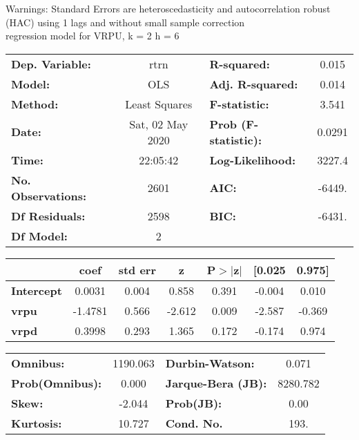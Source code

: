 Warnings: \newline
 [1] Standard Errors are heteroscedasticity and autocorrelation robust (HAC) using 1 lags and without small sample correction\\ 

regression model for VRPU, k = 2 h = 6\begin{center}
\begin{tabular}{lclc}
\toprule
\textbf{Dep. Variable:}    &       rtrn       & \textbf{  R-squared:         } &     0.015   \\
\textbf{Model:}            &       OLS        & \textbf{  Adj. R-squared:    } &     0.014   \\
\textbf{Method:}           &  Least Squares   & \textbf{  F-statistic:       } &     3.541   \\
\textbf{Date:}             & Sat, 02 May 2020 & \textbf{  Prob (F-statistic):} &   0.0291    \\
\textbf{Time:}             &     22:05:42     & \textbf{  Log-Likelihood:    } &    3227.4   \\
\textbf{No. Observations:} &        2601      & \textbf{  AIC:               } &    -6449.   \\
\textbf{Df Residuals:}     &        2598      & \textbf{  BIC:               } &    -6431.   \\
\textbf{Df Model:}         &           2      & \textbf{                     } &             \\
\bottomrule
\end{tabular}
\begin{tabular}{lcccccc}
                   & \textbf{coef} & \textbf{std err} & \textbf{z} & \textbf{P$> |$z$|$} & \textbf{[0.025} & \textbf{0.975]}  \\
\midrule
\textbf{Intercept} &       0.0031  &        0.004     &     0.858  &         0.391        &       -0.004    &        0.010     \\
\textbf{vrpu}      &      -1.4781  &        0.566     &    -2.612  &         0.009        &       -2.587    &       -0.369     \\
\textbf{vrpd}      &       0.3998  &        0.293     &     1.365  &         0.172        &       -0.174    &        0.974     \\
\bottomrule
\end{tabular}
\begin{tabular}{lclc}
\textbf{Omnibus:}       & 1190.063 & \textbf{  Durbin-Watson:     } &    0.071  \\
\textbf{Prob(Omnibus):} &   0.000  & \textbf{  Jarque-Bera (JB):  } & 8280.782  \\
\textbf{Skew:}          &  -2.044  & \textbf{  Prob(JB):          } &     0.00  \\
\textbf{Kurtosis:}      &  10.727  & \textbf{  Cond. No.          } &     193.  \\
\bottomrule
\end{tabular}
\end{center}

